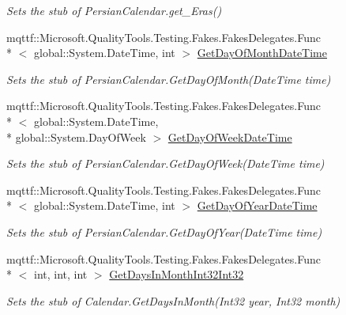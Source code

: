 \begin{DoxyCompactItemize}
\begin{DoxyCompactList}\small\item\em Sets the stub of Persian\-Calendar.\-get\-\_\-\-Eras()\end{DoxyCompactList}\item 
mqttf\-::\-Microsoft.\-Quality\-Tools.\-Testing.\-Fakes.\-Fakes\-Delegates.\-Func\\*
$<$ global\-::\-System.\-Date\-Time, int $>$ \hyperlink{class_system_1_1_globalization_1_1_fakes_1_1_stub_persian_calendar_a6e48c439b45e320cf8c445e62ad5841f}{Get\-Day\-Of\-Month\-Date\-Time}
\begin{DoxyCompactList}\small\item\em Sets the stub of Persian\-Calendar.\-Get\-Day\-Of\-Month(\-Date\-Time time)\end{DoxyCompactList}\item 
mqttf\-::\-Microsoft.\-Quality\-Tools.\-Testing.\-Fakes.\-Fakes\-Delegates.\-Func\\*
$<$ global\-::\-System.\-Date\-Time, \\*
global\-::\-System.\-Day\-Of\-Week $>$ \hyperlink{class_system_1_1_globalization_1_1_fakes_1_1_stub_persian_calendar_ae474d144f1db340011b65ae32faa87fb}{Get\-Day\-Of\-Week\-Date\-Time}
\begin{DoxyCompactList}\small\item\em Sets the stub of Persian\-Calendar.\-Get\-Day\-Of\-Week(\-Date\-Time time)\end{DoxyCompactList}\item 
mqttf\-::\-Microsoft.\-Quality\-Tools.\-Testing.\-Fakes.\-Fakes\-Delegates.\-Func\\*
$<$ global\-::\-System.\-Date\-Time, int $>$ \hyperlink{class_system_1_1_globalization_1_1_fakes_1_1_stub_persian_calendar_a0256884a1bd969b902e55fe746c1217e}{Get\-Day\-Of\-Year\-Date\-Time}
\begin{DoxyCompactList}\small\item\em Sets the stub of Persian\-Calendar.\-Get\-Day\-Of\-Year(\-Date\-Time time)\end{DoxyCompactList}\item 
mqttf\-::\-Microsoft.\-Quality\-Tools.\-Testing.\-Fakes.\-Fakes\-Delegates.\-Func\\*
$<$ int, int, int $>$ \hyperlink{class_system_1_1_globalization_1_1_fakes_1_1_stub_persian_calendar_ab0297fceb02c4b7ceecc4fb256be954f}{Get\-Days\-In\-Month\-Int32\-Int32}
\begin{DoxyCompactList}\small\item\em Sets the stub of Calendar.\-Get\-Days\-In\-Month(\-Int32 year, Int32 month)\end{DoxyCompactList}\item 

\end{DoxyCompactItemize}
